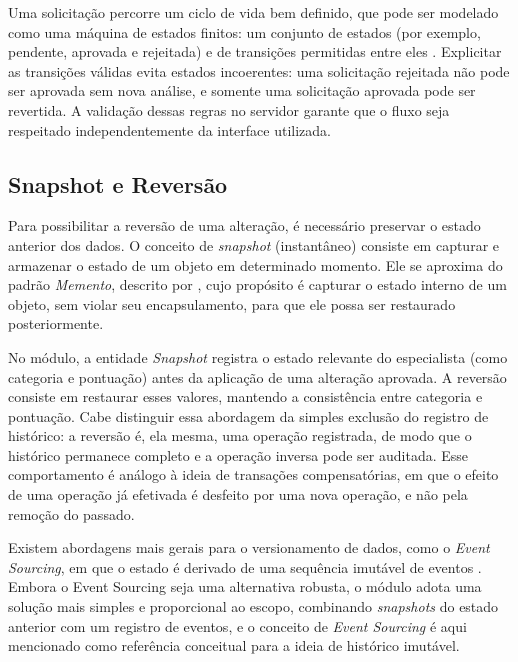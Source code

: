Uma solicitação percorre um ciclo de vida bem definido, que pode ser modelado como uma máquina
de estados finitos: um conjunto de estados (por exemplo, pendente, aprovada e rejeitada) e de
transições permitidas entre eles \cite{sommerville2011}. Explicitar as transições válidas evita
estados incoerentes: uma solicitação rejeitada não pode ser aprovada sem nova análise, e somente
uma solicitação aprovada pode ser revertida. A validação dessas regras no servidor garante que o
fluxo seja respeitado independentemente da interface utilizada.


\subsection{Snapshot e Reversão}
\label{subsec:snapshot-reversao}

Para possibilitar a reversão de uma alteração, é necessário preservar o estado anterior dos
dados. O conceito de \textit{snapshot} (instantâneo) consiste em capturar e armazenar o estado
de um objeto em determinado momento. Ele se aproxima do padrão \textit{Memento}, descrito por
, cujo propósito é capturar o estado interno de um objeto, sem
violar seu encapsulamento, para que ele possa ser restaurado posteriormente.

No módulo, a entidade \textit{Snapshot} registra o estado relevante do especialista (como
categoria e pontuação) antes da aplicação de uma alteração aprovada. A reversão consiste em
restaurar esses valores, mantendo a consistência entre categoria e pontuação. Cabe distinguir
essa abordagem da simples exclusão do registro de histórico: a reversão é, ela mesma, uma
operação registrada, de modo que o histórico permanece completo e a operação inversa pode ser
auditada. Esse comportamento é análogo à ideia de transações compensatórias, em que o efeito
de uma operação já efetivada é desfeito por uma nova operação, e não pela remoção do
passado.

Existem abordagens mais gerais para o versionamento de dados, como o \textit{Event Sourcing}, em
que o estado é derivado de uma sequência imutável de eventos \cite{fowler2005, kleppmann2017}. Embora o
Event Sourcing seja uma alternativa robusta, o módulo adota uma solução mais simples e proporcional ao
escopo, combinando \textit{snapshots} do estado anterior com um registro de eventos, e o conceito
de \textit{Event Sourcing} é aqui mencionado como referência conceitual para a ideia de histórico imutável.

